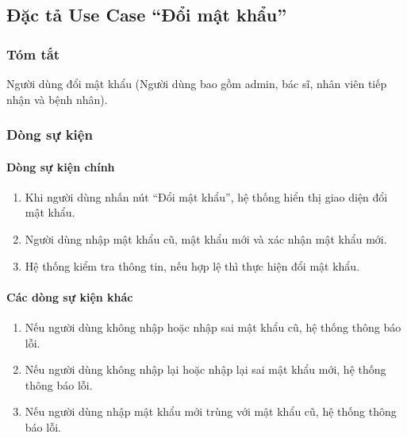 \subsection{Đặc tả Use Case ``Đổi mật khẩu''}

\subsubsection{Tóm tắt}
Người dùng đổi mật khẩu (Người dùng bao gồm admin, bác sĩ, nhân viên tiếp nhận và bệnh nhân).

\subsubsection{Dòng sự kiện}
\paragraph{\textbf{Dòng sự kiện chính}}
\begin{enumerate}
    \item Khi người dùng nhấn nút ``Đổi mật khẩu'', hệ thống hiển thị giao diện đổi mật khẩu.
    \item Người dùng nhập mật khẩu cũ, mật khẩu mới và xác nhận mật khẩu mới.
    \item Hệ thống kiểm tra thông tin, nếu hợp lệ thì thực hiện đổi mật khẩu.
\end{enumerate}

\paragraph{\textbf{Các dòng sự kiện khác}}
\begin{enumerate}
    \item Nếu người dùng không nhập hoặc nhập sai mật khẩu cũ, hệ thống thông báo lỗi.
    \item Nếu người dùng không nhập lại hoặc nhập lại sai mật khẩu mới, hệ thống thông báo lỗi.
    \item Nếu người dùng nhập mật khẩu mới trùng với mật khẩu cũ, hệ thống thông báo lỗi.
\end{enumerate}

